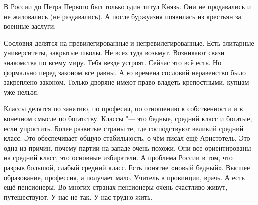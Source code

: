 \begin{enumerate}
В России до Петра Первого был только один титул Князь. Они не продавались и не жаловались (не раздавались). А после буржуазия появилась из крестьян за военные заслуги.

Сословия делятся на превилегированные и непревилегированные. Есть элитарные университеты, закрытые школы. Не всех туда возьмут. Возникают связи знакомства по всему миру. Тебя везде устроят. Сейчас это всё есть. Но формально перед законом все равны. А во времена сословий неравенство было закреплено законом. Только дворяне имеют право владеть крепостными, купцам уже нельзя.

Классы делятся по занятию, по професии, по отношению к собственности и в конечном смысле по богатству. Классы "--- это бедные, средний класс и богатые, если упростить. Более развитые страны те, где господствуют великий средний класс. Это обеспечивает общую стабильность, о чём писал ещё Аристотель. Это одна из причин, почему партии на западе очень похожи. Они все ориентированы на средний класс, это основные избиратели. А проблема России в том, что разрыв большой, слабый средний класс. Есть понятие «новый бедный». Высшее образование, профессия, а получает мало. Учитель в провинции, врачь. А есть ещё пенсионеры. Во многих странах пенсионеры очень счастливо живут, путешествуют. У нас не так. У нас трудно жить.
\end{enumerate}
